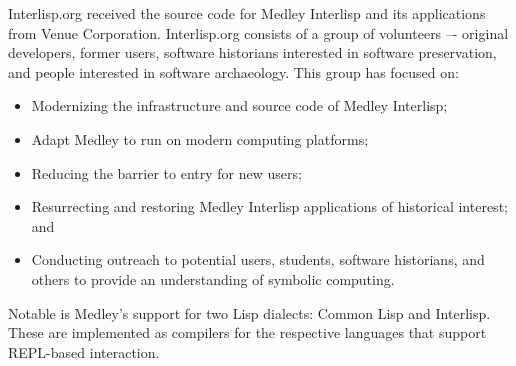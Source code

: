 \documentclass[sigconf]{acmart}
\begin{document}
Interlisp.org received the source code for Medley Interlisp and its applications from Venue Corporation. Interlisp.org consists of a group of volunteers –- original developers, former users, software historians interested in software preservation, and people interested in software archaeology. This group has focused on:

\begin{itemize}
  \item Modernizing the infrastructure and source code of Medley Interlisp;

  \item Adapt Medley to run on modern computing platforms;

  \item Reducing the barrier to entry for new users; 

  \item Resurrecting and restoring Medley Interlisp applications of historical interest; and

  \item Conducting outreach to potential users, students, software historians, and others to provide an understanding of symbolic computing.
\end{itemize}

Notable is Medley's support for two Lisp dialects: Common Lisp and Interlisp. These are implemented as compilers for the respective languages that support REPL-based interaction.








\end{document}
